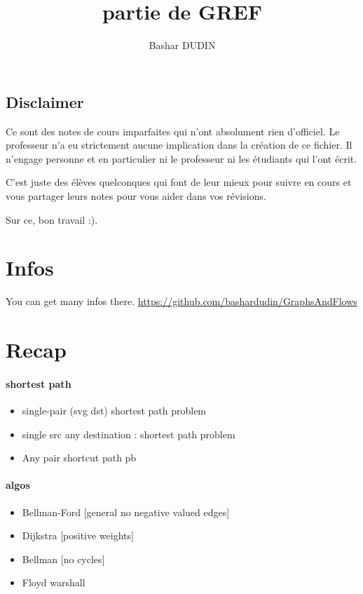 \documentclass[a4paper,11pt]{article}
\title{partie de GREF}
\author{Bashar DUDIN}
\date{}
\begin{document}
\maketitle

\subsection*{Disclaimer}

Ce sont des notes de cours imparfaites qui n'ont absolument rien d'officiel.
Le professeur n'a eu strictement aucune implication dans la création de ce
fichier. Il n'engage personne et en particulier ni le professeur ni les
étudiants qui l'ont écrit.

C'est juste des élèves quelconques qui font de leur mieux pour suivre en cours
et vous partager leurs notes pour vous aider dans vos révisions.

Sur ce, bon travail :).

\tableofcontents
\newpage
\section{Infos}
You can get many infos there.
\url{https://github.com/bashardudin/GraphsAndFlows}

\section{Recap}
\paragraph{shortest path}
\begin{itemize}
  \item single-pair (svg dst) shortest path problem
  \item single src any destination : shortest path problem
  \item Any pair shortcut path pb
\end{itemize}

\paragraph{algos}
\begin{itemize}
  \item Bellman-Ford [general no negative valued edges]
  \item Dijkstra [positive weights]
  \item Bellman  [no cycles]
  \item Floyd warshall 
\end{itemize}
\end{document}
